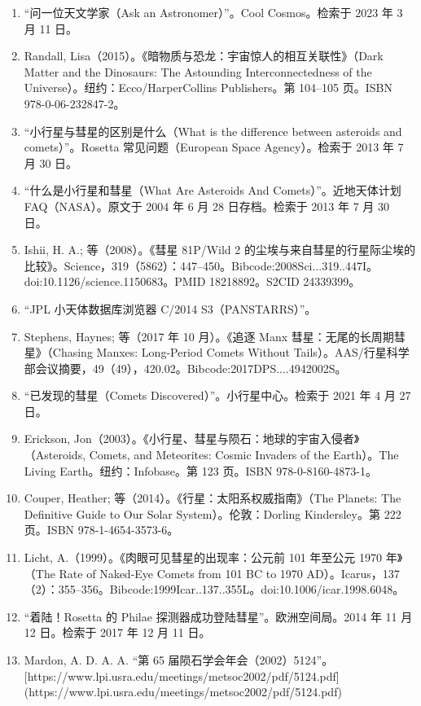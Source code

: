 \begin{enumerate}
\item “问一位天文学家（Ask an Astronomer）”。Cool Cosmos。检索于 2023 年 3 月 11 日。
\item Randall, Lisa（2015）。《暗物质与恐龙：宇宙惊人的相互关联性》（Dark Matter and the Dinosaurs: The Astounding Interconnectedness of the Universe）。纽约：Ecco/HarperCollins Publishers。第 104–105 页。ISBN 978-0-06-232847-2。
\item “小行星与彗星的区别是什么（What is the difference between asteroids and comets）”。Rosetta 常见问题（European Space Agency）。检索于 2013 年 7 月 30 日。
\item “什么是小行星和彗星（What Are Asteroids And Comets）”。近地天体计划 FAQ（NASA）。原文于 2004 年 6 月 28 日存档。检索于 2013 年 7 月 30 日。
\item Ishii, H. A.; 等（2008）。《彗星 81P/Wild 2 的尘埃与来自彗星的行星际尘埃的比较》。Science，319（5862）：447–450。Bibcode:2008Sci...319..447I。doi:10.1126/science.1150683。PMID 18218892。S2CID 24339399。
\item “JPL 小天体数据库浏览器 C/2014 S3（PANSTARRS）”。
\item Stephens, Haynes; 等（2017 年 10 月）。《追逐 Manx 彗星：无尾的长周期彗星》（Chasing Manxes: Long-Period Comets Without Tails）。AAS/行星科学部会议摘要，49（49），420.02。Bibcode:2017DPS....4942002S。
\item “已发现的彗星（Comets Discovered）”。小行星中心。检索于 2021 年 4 月 27 日。
\item Erickson, Jon（2003）。《小行星、彗星与陨石：地球的宇宙入侵者》（Asteroids, Comets, and Meteorites: Cosmic Invaders of the Earth）。The Living Earth。纽约：Infobase。第 123 页。ISBN 978-0-8160-4873-1。
\item Couper, Heather; 等（2014）。《行星：太阳系权威指南》（The Planets: The Definitive Guide to Our Solar System）。伦敦：Dorling Kindersley。第 222 页。ISBN 978-1-4654-3573-6。
\item Licht, A.（1999）。《肉眼可见彗星的出现率：公元前 101 年至公元 1970 年》（The Rate of Naked-Eye Comets from 101 BC to 1970 AD）。Icarus，137（2）：355–356。Bibcode:1999Icar..137..355L。doi:10.1006/icar.1998.6048。
\item “着陆！Rosetta 的 Philae 探测器成功登陆彗星”。欧洲空间局。2014 年 11 月 12 日。检索于 2017 年 12 月 11 日。
\item Mardon, A. D. A. A. “第 65 届陨石学会年会（2002）5124”。[https://www.lpi.usra.edu/meetings/metsoc2002/pdf/5124.pdf](https://www.lpi.usra.edu/meetings/metsoc2002/pdf/5124.pdf)

\end{enumerate}
